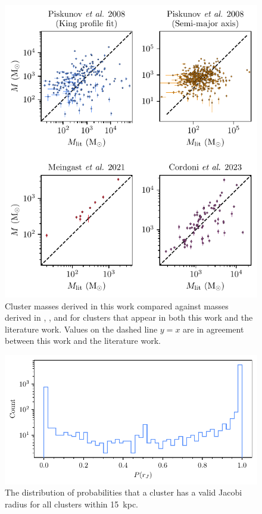 \begin{figure}[p]
    \centering
    \includegraphics[width=\textwidth]{fig/c4/results_mass_comparison.pdf}
    \caption[Cluster masses derived in this work compared against masses derived in literature works.]{Cluster masses derived in this work compared against masses derived in \cite{piskunov_tidal_2008}, \cite{meingast_extended_2021}, and \cite{cordoni_photometric_binaries_2023} for clusters that appear in both this work and the literature work. Values on the dashed line $y=x$ are in agreement between this work and the literature work.}
    \label{fig:dynamics:results:mass_comparison}
\end{figure}

\begin{figure}[t]
    \centering
    \includegraphics[width=\textwidth]{fig/c4/results_p_jac_distribution.pdf}
    \caption[The distribution of probabilities that a cluster has a valid Jacobi radius]{The distribution of probabilities that a cluster has a valid Jacobi radius for all clusters within 15~kpc.}
    \label{fig:dynamics:results:jacobi_radii_distribution}
\end{figure}

